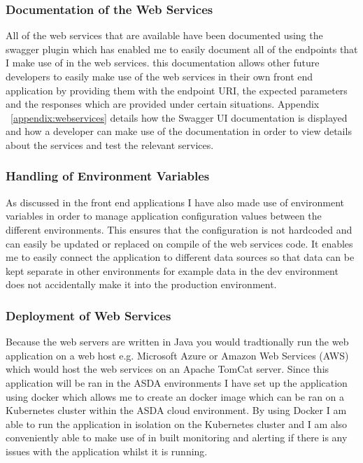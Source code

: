 \documentclass[a4paper,11pt]{report}
\begin{document}
\subsubsection{Documentation of the Web Services}
All of the web services that are available have been documented using the swagger plugin which has enabled me to easily document all of the endpoints that I make use of in the web services. this documentation allows other future developers to easily make use of the web services in their own front end application by providing them with the endpoint URI, the expected parameters and the responses which are provided under certain situations. Appendix ~\ref{appendix:webservices} details how the Swagger UI documentation is displayed and how a developer can make use of the documentation in order to view details about the services and test the relevant services.

\subsubsection{Handling of Environment Variables}
As discussed in the front end applications I have also made use of environment variables in order to manage application configuration values between the different environments. This ensures that the configuration is not hardcoded and can easily be updated or replaced on compile of the web services code. It enables me to easily connect the application to different data sources so that data can be kept separate in other environments for example data in the dev environment does not accidentally make it into the production environment. 


\subsubsection{Deployment of Web Services}
Because the web servers are written in Java you would tradtionally run the web application on a web host e.g. Microsoft Azure or Amazon Web Services (AWS) which would host the web services on an Apache TomCat server. Since this application will be ran in the ASDA environments I have set up the application using docker which allows me to create an docker image which can be ran on a Kubernetes cluster within the ASDA cloud environment. 
By using Docker I am able to run the application in isolation on the Kubernetes cluster and I am also conveniently able to make use of in built monitoring and alerting if there is any issues with the application whilst it is running. 
\end{document}
